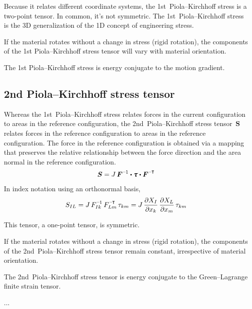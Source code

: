 {Because it relates different coordinate systems, the 1st~Piola\hbox{--}Kirchhoff stress is a two-point tensor. In common, it’s not symmetric. The 1st~Piola\hbox{--}Kirchhoff stress is the 3D generalization of the 1D concept of engineering stress.

If the material rotates without a change in stress (rigid rotation), the components of the 1st Piola\hbox{--}Kirchhoff stress tensor will vary with material orientation.

The 1st Piola\hbox{--}Kirchhoff stress is energy conjugate to the motion gradient.

\subsection*{2nd Piola\hbox{--}Kirchhoff stress tensor}

Whereas the 1st~Piola\hbox{--}Kirchhoff stress relates forces in the current configuration to areas in the reference configuration, the 2nd~Piola\hbox{--}Kirchhoff stress tensor~$\bm{S}$ relates forces in the reference configuration to areas in the reference configuration. The force in the reference configuration is obtained via a mapping that preserves the relative relationship between the force direction and the area normal in the reference configuration.
\[
\bm{S} = J \, \bm{F}^{\expminusone} \dotp \cauchystress \dotp \bm{F}^{\expminusT}
\]

In index notation using an orthonormal basis,
\[
S_{IL} = J \, F_{Ik}^{\expminusone} \, F_{Lm}^{\expminusT} \, \tau_{km} =
J \, \frac{\partial X_{I}}{\partial x_{k}} \, \frac{\partial X_{L}}{\partial x_{m}} \, \tau_{km}
\]

This tensor, a one\hbox{-}point tensor, is symmetric.

If the material rotates without a change in stress (rigid rotation), the components of the 2nd~Piola\hbox{--}Kirchhoff stress tensor remain constant, irrespective of material orientation.

The 2nd~Piola\hbox{--}Kirchhoff stress tensor is energy conjugate to the Green\hbox{--}Lagrange finite strain tensor.
\par}


...



\newpage


